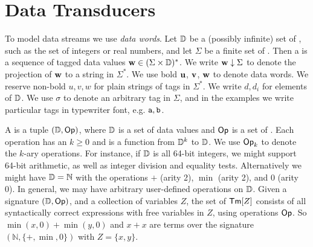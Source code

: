 \section{Data Transducers}
\label{dt:sec:model}
\label{dt:subsec:preliminaries}

To model data streams we use \emph{data words}.
Let $\mathbb{D}$ be a (possibly infinite) set of ,
such as the set of integers or real numbers,
and let $\Sigma$ be a finite set of .
Then a  is a sequence of tagged data values
$\textbf{w} \in (\Sigma \times \mathbb{D})^*$.
We write $\textbf{w} \downarrow \Sigma$ to denote
the projection of $\textbf{w}$ to a string in $\Sigma^*$.
We use bold $\textbf{u}$, $\textbf{v}$, $\textbf{w}$ to denote data words.
We reserve non-bold $u, v, w$ for plain strings of tags in $\Sigma^*$.
We write $d, d_i$ for elements of $\mathbb{D}$.
We use $\sigma$ to denote an arbitrary tag in $\Sigma$,
and in the examples we write particular tags in typewriter font, e.g. $\texttt{a}, \texttt{b}$.

A  is a tuple $(\mathbb{D}, \textsf{Op})$,
where $\mathbb{D}$ is a set of data values
and $\textsf{Op}$ is a set of .
Each operation has an  $k \ge 0$
and is a function from $\mathbb{D}^k$ to $\mathbb{D}$.
We use $\textsf{Op}_k$ to denote the $k$-ary operations.
For instance, if $\mathbb{D}$ is all 64-bit integers, we might support 64-bit arithmetic, as well as
integer division and equality tests.
Alternatively we might have $\mathbb{D} = \mathbb{N}$
with the operations $+$ (arity 2), $\min$ (arity 2), and $0$ (arity 0).
In general, we may have arbitrary user-defined operations on $\mathbb{D}$.
Given a signature $(\mathbb{D}, \textsf{Op})$,
and a collection of variables $Z$,
the set of  $\textsf{Tm}[Z]$
consists of all syntactically correct expressions
with free variables in $Z$, using operations $\textsf{Op}$.
So $\min(x,0) + \min(y,0)$ and $x + x$
are terms over the signature $(\mathbb{N}, \{+,\min,0\})$ with $Z = \{x,y\}$.

